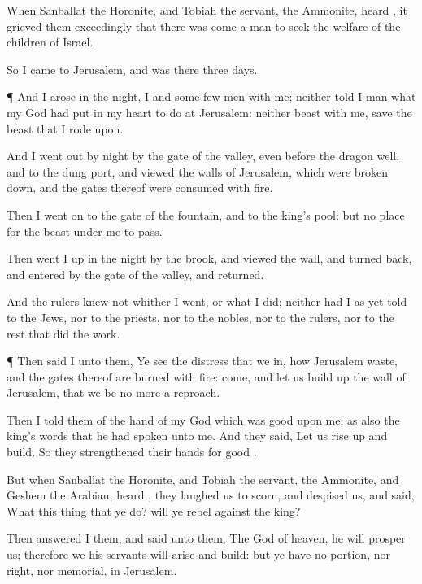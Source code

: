 {When
Sanballat the
Horonite, and
Tobiah the
servant, the
Ammonite,
heard
{}, it
grieved them
exceedingly that there was
come a
man to
seek the
welfare of the
children of
Israel.

So I
came to
Jerusalem, and was there
three
days.


\par }{\PP {}¶ And I
arose in the
night, I and
some
few
men with me; neither
told I
{}
man what my
God had
put in my
heart to
do at
Jerusalem: neither
{}
beast with me, save the
beast that I rode
upon.

And I went
out by
night by the
gate of the
valley, even
before the
dragon
well, and to the
dung
port, and
viewed the
walls of
Jerusalem, which were broken
down, and the
gates thereof were
consumed with
fire.

Then I went
on to the
gate of the
fountain, and to the
king’s
pool: but
{} no
place for the
beast
{} under me to
pass.

Then went I
up in the
night by the
brook, and
viewed the
wall, and turned
back, and
entered by the
gate of the
valley, and
{}
returned.

And the
rulers
knew not whither I
went, or what I
did; neither had I as
yet
told
{} to the
Jews, nor to the
priests, nor to the
nobles, nor to the
rulers, nor to the
rest that
did the
work.


\par }{\PP {}¶ Then
said I unto them, Ye
see the
distress that we
{} in, how
Jerusalem
{}
waste, and the
gates thereof are
burned with
fire:
come, and let us build
up the
wall of
Jerusalem, that we be no more a
reproach.

Then I
told them of the
hand of my
God which was
good upon me; as also the
king’s
words that he had
spoken unto me. And they
said, Let us rise
up and
build. So they
strengthened their
hands for
{}
good
{}.

But when
Sanballat the
Horonite, and
Tobiah the
servant, the
Ammonite, and
Geshem the
Arabian,
heard
{}, they laughed us to
scorn, and
despised us, and
said, What
{} this
thing that ye
do? will ye
rebel against the
king?

Then
answered I them, and
said unto them, The
God of
heaven, he will
prosper us; therefore we his
servants will
arise and
build: but ye have no
portion, nor
right, nor
memorial, in
Jerusalem.




}

